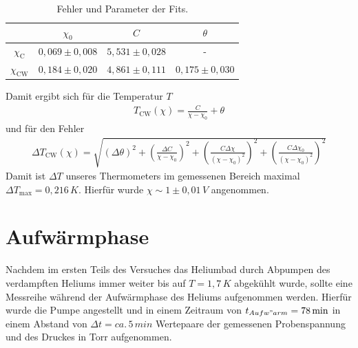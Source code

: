 \documentclass[twoside,colorback,accentcolor=tud4c,11pt]{tudreport}
\begin{document}
\begin{table}[H]
\centering
\begin{tabular}{|c|c|c|c|}
\hline 
 & $ \chi_0 $ & $C$ & $\theta$ \\ 
\hline 
$ \chi_{\text{C}} $ & $ 0,069\pm 0,008 $ & $5,531\pm 0,028 $& - \\ 
\hline 
$ \chi_{\text{CW}} $ & $ 0,184\pm 0,020 $ & $  4,861\pm 0,111$ & $  0,175\pm 0,030$ \\ 
\hline 
\end{tabular} 
\caption{Fehler und Parameter der Fits.}\label{tab:fits}
\end{table}
Damit ergibt sich für die Temperatur $T$
\begin{align}
T_{\text{CW}}(\chi)=\frac{C}{\chi-\chi_0}+\theta
\end{align} 
und für den Fehler
\begin{align}
\Delta T_{\text{CW}}(\chi)=\sqrt{\left(\Delta\theta\right)^2+\left(\frac{\Delta C}{\chi-\chi_0}\right)^2+\left(\frac{C\Delta\chi}{(\chi-\chi_0)^2}\right)^2+\left(\frac{C\Delta\chi_0}{(\chi-\chi_0)^2}\right)^2}
\end{align}
Damit ist $ \Delta T $ unseres Thermometers im gemessenen Bereich maximal $ \Delta T_{\text{max}}=0,216\,\si{K} $. Hierfür wurde $ \chi\sim 1\pm 0,01\,\si{V} $ angenommen.
\section{Aufwärmphase}
Nachdem im ersten Teils des Versuches das Heliumbad durch Abpumpen des verdampften Heliums immer weiter bis auf $T=1,7\,\si{K}$ abgekühlt wurde, sollte eine Messreihe während der Aufwärmphase des Heliums aufgenommen werden. Hierfür wurde die Pumpe angestellt und in einem Zeitraum von $t_{Aufw"arm}=78\,\si{min}$ in einem Abstand von $\Delta t=ca.\,5\,\si{min}$ Wertepaare der gemessenen Probenspannung und des Druckes in Torr aufgenommen.
\end{document}
